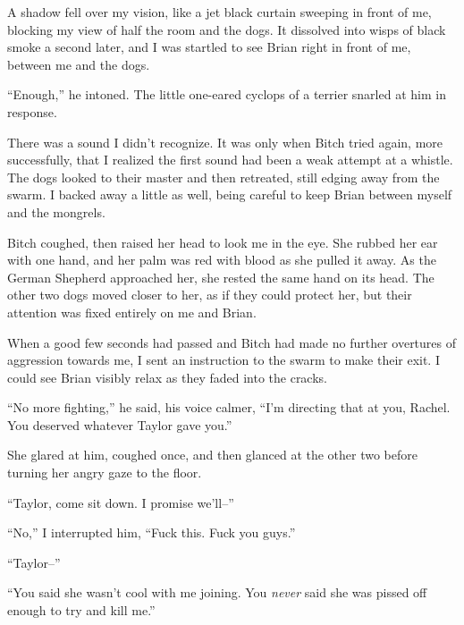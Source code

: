 A shadow fell over my vision, like a jet black curtain sweeping in front of me, blocking my view of half the room and the dogs.  It dissolved into wisps of black smoke a second later, and I was startled to see Brian right in front of me, between me and the dogs.



``Enough,'' he intoned.  The little one-eared cyclops of a terrier snarled at him in response.



There was a sound I didn't recognize.  It was only when Bitch tried again, more successfully, that I realized the first sound had been a weak attempt at a whistle.  The dogs looked to their master and then retreated, still edging away from the swarm.  I backed away a little as well, being careful to keep Brian between myself and the mongrels.



Bitch coughed, then raised her head to look me in the eye.  She rubbed her ear with one hand, and her palm was red with blood as she pulled it away.  As the German Shepherd approached her, she rested the same hand on its head.  The other two dogs moved closer to her, as if they could protect her, but their attention was fixed entirely on me and Brian.



When a good few seconds had passed and Bitch had made no further overtures of aggression towards me, I sent an instruction to the swarm to make their exit.  I could see Brian visibly relax as they faded into the cracks.



``No more fighting,'' he said, his voice calmer, ``I'm directing that at you, Rachel.  You deserved whatever Taylor gave you.''



She glared at him, coughed once, and then glanced at the other two before turning her angry gaze to the floor.



``Taylor, come sit down.  I promise we'll--''



``No,'' I interrupted him, ``Fuck this.  Fuck you guys.''



``Taylor--''



``You said she wasn't cool with me joining.  You \emph{never} said she was pissed off enough to try and kill me.''



